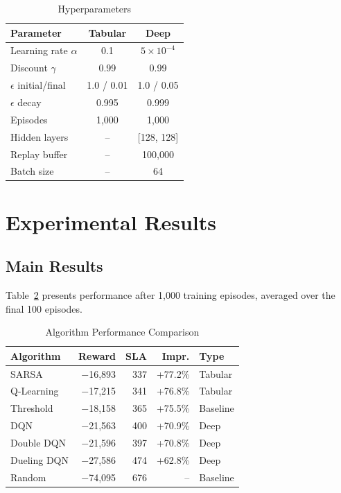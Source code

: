 \documentclass[conference]{IEEEtran}
\begin{document}
\begin{table}[htbp]
\centering
\caption{Hyperparameters}
\label{tab:hyperparams}
\begin{tabular}{lcc}
\toprule
\textbf{Parameter} & \textbf{Tabular} & \textbf{Deep} \\
\midrule
Learning rate $\alpha$ & 0.1 & $5 \times 10^{-4}$ \\
Discount $\gamma$ & 0.99 & 0.99 \\
$\epsilon$ initial/final & 1.0 / 0.01 & 1.0 / 0.05 \\
$\epsilon$ decay & 0.995 & 0.999 \\
Episodes & 1,000 & 1,000 \\
Hidden layers & -- & [128, 128] \\
Replay buffer & -- & 100,000 \\
Batch size & -- & 64 \\
\bottomrule
\end{tabular}
\end{table}

\section{Experimental Results}
\label{sec:results}

\subsection{Main Results}
Table~\ref{tab:results} presents performance after 1,000 training episodes, averaged over the final 100 episodes.

\begin{table}[htbp]
\centering
\caption{Algorithm Performance Comparison}
\label{tab:results}
\begin{tabular}{lrrrl}
\toprule
\textbf{Algorithm} & \textbf{Reward} & \textbf{SLA} & \textbf{Impr.} & \textbf{Type} \\
\midrule
\rowcolor{bestgreen} SARSA & $-$16,893 & 337 & +77.2\% & Tabular \\
\rowcolor{bestgreen} Q-Learning & $-$17,215 & 341 & +76.8\% & Tabular \\
Threshold & $-$18,158 & 365 & +75.5\% & Baseline \\
DQN & $-$21,563 & 400 & +70.9\% & Deep \\
Double DQN & $-$21,596 & 397 & +70.8\% & Deep \\
Dueling DQN & $-$27,586 & 474 & +62.8\% & Deep \\
Random & $-$74,095 & 676 & -- & Baseline \\
\bottomrule
\end{tabular}
\end{table}
\end{document}
